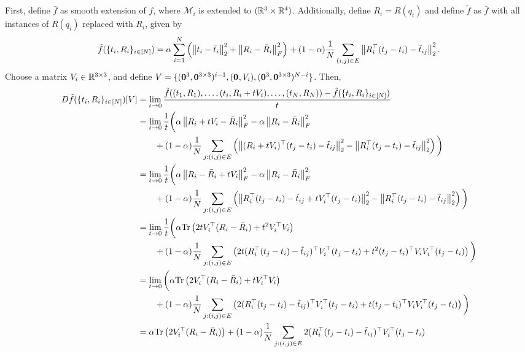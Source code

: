 First, define $\bar{f}$ as smooth extension of $f$, where $\mathcal{M}_i$ is extended to $(\mathbb{R}^{3} \times \mathbb{R}^{4})$.
Additionally, define $R_i = R(q_i)$ and define $\tilde{f}$ as $\bar{f}$ with all instances of $R(q_i)$ replaced with $R_i$, given by
\begin{equation}
    \tilde{f}(\{t_i, R_i\}_{i\in[N]}) = \alpha \sum_{i=1}^N \left( \left\lVert t_i - \bar{t}_i \right\rVert_2^2 + \left\lVert R_i - \bar{R}_i \right\rVert_F^2 \right) + (1-\alpha) \frac{1}{N} \sum_{(i,j)\in E} \left\lVert R_i^\top (t_j - t_i) - \tilde{t}_{ij} \right\rVert_2^2.
\end{equation}
Choose a matrix $V_i\in\mathbb{R}^{3\times 3}$, and define $V = \{(\mathbf{0}^{3},\mathbf{0}^{3\times 3})^{i-1},(\mathbf{0}^{},V_i),(\mathbf{0}^{3},\mathbf{0}^{3\times 3})^{N-i}\}$.
Then,
\begin{align}
    D\tilde{f}(\{t_i, R_i\}_{i\in\seq{N}})[V]
    &= \lim_{t\to0} \frac{\tilde{f}((t_1,R_1),\dots,(t_i,R_i+tV_i),\dots,(t_N,R_N))-\tilde{f}(\{t_i, R_i\}_{i\in\seq{N}})}{t}
    \\
    &= \lim_{t\to0} \frac{1}{t} \bigg( \alpha \norm{R_i+tV_i-\bar{R}_i}_F^2 - \alpha \norm{R_i-\bar{R}_i}_F^2 \\
    &\qquad + (1-\alpha) \frac{1}{N} \sum_{j:(i,j)\in E} \left( \norm{(R_i+tV_i)^\top (t_j-t_i) - \tilde{t}_{ij}}_2^2 - \norm{R_i^\top (t_j-t_i) - \tilde{t}_{ij}}_2^2 \right) \bigg)
    \\
    &= \lim_{t\to0} \frac{1}{t} \bigg( \alpha \norm{R_i-\bar{R}_i+tV_i}_F^2 - \alpha \norm{R_i-\bar{R}_i}_F^2 \\
    &\qquad + (1-\alpha) \frac{1}{N} \sum_{j:(i,j)\in E} \left( \norm{R_i^\top (t_j-t_i) - \tilde{t}_{ij} + tV_i^\top (t_j-t_i)}_2^2 - \norm{R_i^\top (t_j-t_i) - \tilde{t}_{ij}}_2^2 \right) \bigg)
    \\
    &= \lim_{t\to0} \frac{1}{t} \bigg( \alpha \trace\left( 2tV_i^\top (R_i-\bar{R}_i) + t^2V_i^\top V_i\right) \\
    &\qquad + (1-\alpha) \frac{1}{N} \sum_{j:(i,j)\in E} \left( 2t(R_i^\top(t_j-t_i)-\tilde{t}_{ij})^\top V_i^\top(t_j-t_i) + t^2 (t_j-t_i)^\top V_i V_i^\top (t_j-t_i) \right) \bigg)
    \\
    &= \lim_{t\to0} \bigg( \alpha \trace\left( 2V_i^\top (R_i-\bar{R}_i) + tV_i^\top V_i\right) \\
    &\qquad + (1-\alpha) \frac{1}{N} \sum_{j:(i,j)\in E} \left( 2(R_i^\top(t_j-t_i)-\tilde{t}_{ij})^\top V_i^\top(t_j-t_i) + t (t_j-t_i)^\top V_i V_i^\top (t_j-t_i) \right) \bigg)
    \\
    &= \alpha \trace\left( 2V_i^\top (R_i-\bar{R}_i)\right) + (1-\alpha) \frac{1}{N} \sum_{j:(i,j)\in E} 2(R_i^\top(t_j-t_i)-\tilde{t}_{ij})^\top V_i^\top(t_j-t_i)

\end{align}
